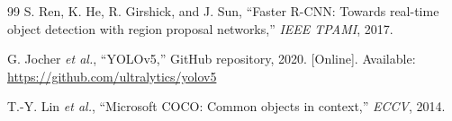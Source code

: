 \documentclass[conference]{IEEEtran}
\begin{document}
\begin{thebibliography}{99}
S. Ren, K. He, R. Girshick, and J. Sun, ``Faster R-CNN: Towards real-time object detection with region proposal networks,'' \emph{IEEE TPAMI}, 2017.

G. Jocher \emph{et al.}, ``YOLOv5,'' GitHub repository, 2020. [Online]. Available: \url{https://github.com/ultralytics/yolov5}

T.-Y. Lin \emph{et al.}, ``Microsoft COCO: Common objects in context,'' \emph{ECCV}, 2014.
\end{thebibliography}
\end{document}
